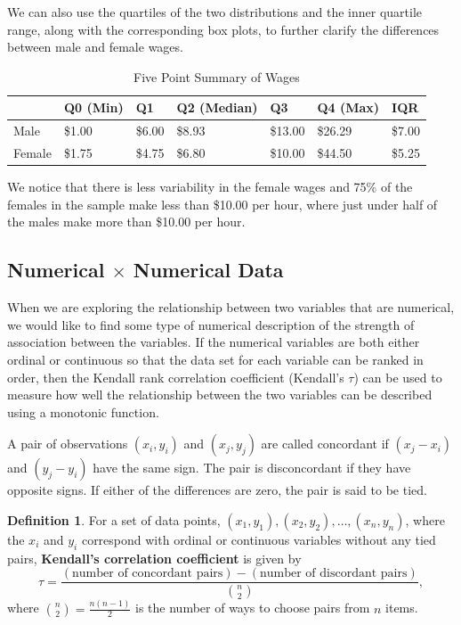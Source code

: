 \documentclass[
]{book}
\theoremstyle{definition}
\newtheorem{definition}{Definition}[chapter]
\theoremstyle{definition}
\theoremstyle{definition}
\theoremstyle{definition}
\theoremstyle{remark}
\begin{document}
We can also use the quartiles of the two distributions and the inner quartile range, along with the corresponding box plots, to further clarify the differences between male and female wages.

\begin{table}

\caption{\label{tab:unnamed-chunk-194}Five Point Summary of Wages}
\centering
\begin{tabular}[t]{lllllll}
\toprule
  & Q0 (Min) & Q1 & Q2 (Median) & Q3 & Q4 (Max) & IQR\\
\midrule
Male & \$1.00 & \$6.00 & \$8.93 & \$13.00 & \$26.29 & \$7.00\\
Female & \$1.75 & \$4.75 & \$6.80 & \$10.00 & \$44.50 & \$5.25\\
\bottomrule
\end{tabular}
\end{table}

We notice that there is less variability in the female wages and 75\% of the females in the sample make less than \$10.00 per hour, where just under half of the males make more than \$10.00 per hour.

\hypertarget{numerical-times-numerical-data}{%
\subsection{\texorpdfstring{Numerical \(\times\) Numerical Data}{Numerical \textbackslash times Numerical Data}}\label{numerical-times-numerical-data}}

When we are exploring the relationship between two variables that are numerical, we would like to find some type of numerical description of the strength of association between the variables. If the numerical variables are both either ordinal or continuous so that the data set for each variable can be ranked in order, then the Kendall rank correlation coefficient (Kendall's \(\tau\)) can be used to measure how well the relationship between the two variables can be described using a monotonic function.

A pair of observations \((x_i,y_i)\) and \((x_j,y_j)\) are called concordant if \((x_j-x_i)\) and \((y_j-y_i)\) have the same sign. The pair is disconcordant if they have opposite signs. If either of the differences are zero, the pair is said to be tied.

\begin{definition}
For a set of data points, \((x_1, y_1), (x_2, y_2), \ldots, (x_n,y_n)\), where the \(x_i\) and \(y_i\) correspond with ordinal or continuous variables without any tied pairs, \textbf{Kendall's correlation coefficient} is given by
\[\tau = \frac{(\mbox{number of concordant pairs})- (\mbox{number of discordant pairs})}{\binom{n}{2}},\]
where \(\binom{n}{2}=\frac{n(n-1)}{2}\) is the number of ways to choose pairs from \(n\) items.
\end{definition}
\end{document}
